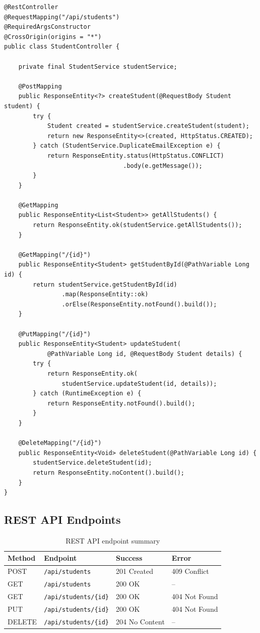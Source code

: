 \documentclass[12pt,a4paper]{article}
\begin{document}
\begin{lstlisting}[style=javastyle, caption={REST controller endpoints}]
@RestController
@RequestMapping("/api/students")
@RequiredArgsConstructor
@CrossOrigin(origins = "*")
public class StudentController {

    private final StudentService studentService;

    @PostMapping
    public ResponseEntity<?> createStudent(@RequestBody Student student) {
        try {
            Student created = studentService.createStudent(student);
            return new ResponseEntity<>(created, HttpStatus.CREATED);
        } catch (StudentService.DuplicateEmailException e) {
            return ResponseEntity.status(HttpStatus.CONFLICT)
                                 .body(e.getMessage());
        }
    }

    @GetMapping
    public ResponseEntity<List<Student>> getAllStudents() {
        return ResponseEntity.ok(studentService.getAllStudents());
    }

    @GetMapping("/{id}")
    public ResponseEntity<Student> getStudentById(@PathVariable Long id) {
        return studentService.getStudentById(id)
                .map(ResponseEntity::ok)
                .orElse(ResponseEntity.notFound().build());
    }

    @PutMapping("/{id}")
    public ResponseEntity<Student> updateStudent(
            @PathVariable Long id, @RequestBody Student details) {
        try {
            return ResponseEntity.ok(
                studentService.updateStudent(id, details));
        } catch (RuntimeException e) {
            return ResponseEntity.notFound().build();
        }
    }

    @DeleteMapping("/{id}")
    public ResponseEntity<Void> deleteStudent(@PathVariable Long id) {
        studentService.deleteStudent(id);
        return ResponseEntity.noContent().build();
    }
}
\end{lstlisting}

\subsection{REST API Endpoints}

\begin{table}[h!]
\centering
\begin{tabular}{llll}
    \toprule
    \textbf{Method} & \textbf{Endpoint} & \textbf{Success} & \textbf{Error} \\
    \midrule
    POST & \texttt{/api/students} & 201 Created & 409 Conflict \\
    GET & \texttt{/api/students} & 200 OK & -- \\
    GET & \texttt{/api/students/\{id\}} & 200 OK & 404 Not Found \\
    PUT & \texttt{/api/students/\{id\}} & 200 OK & 404 Not Found \\
    DELETE & \texttt{/api/students/\{id\}} & 204 No Content & -- \\
    \bottomrule
\end{tabular}
\caption{REST API endpoint summary}
\end{table}
\end{document}
